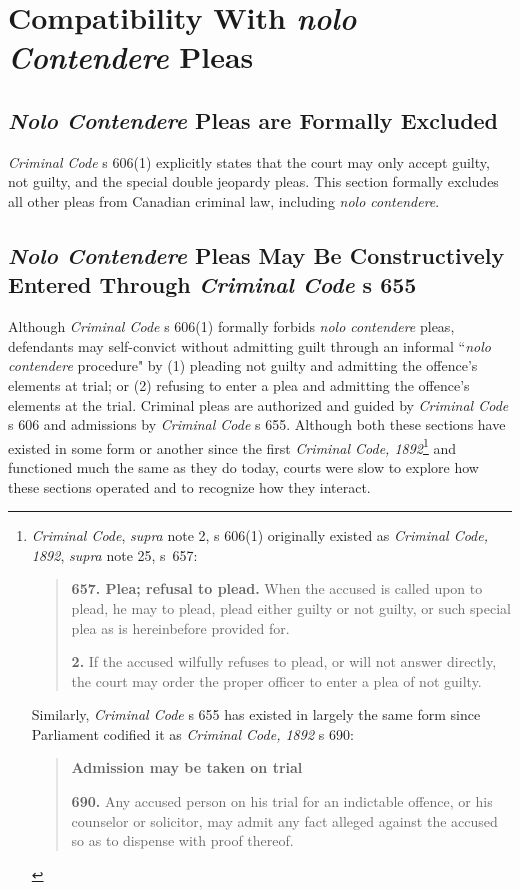 \section{Compatibility With \textit{nolo Contendere} Pleas}

\subsection{\textit{Nolo Contendere} Pleas are Formally Excluded}

\textit{Criminal Code} s 606(1) explicitly states that the court may only accept guilty, not guilty, and the special double jeopardy pleas. This section formally excludes all other pleas from Canadian criminal law, including \textit{nolo contendere}. 

\subsection{\textit{Nolo Contendere} Pleas May Be Constructively Entered Through \textit{Criminal Code} s 655}

Although \textit{Criminal Code} s 606(1) formally forbids \textit{nolo contendere} pleas, defendants may self-convict without admitting guilt through an informal ``\textit{nolo contendere} procedure" by (1) pleading not guilty and admitting the offence's elements at trial; or (2) refusing to enter a plea and admitting the offence's elements at the trial. Criminal pleas are authorized and guided by \textit{Criminal Code} s 606 and admissions by \textit{Criminal Code} s 655. Although both these sections have existed in some form or another since the first \textit{Criminal Code, 1892}\footnote{\textit{Criminal Code}, \textit{supra} note 2, s 606(1) originally existed as \textit{Criminal Code, 1892}, \textit{supra} note 25, s 657:

\begin{quote}
\textbf{657. Plea; refusal to plead.} When the accused is called upon to plead, he may to plead, plead either guilty or not guilty, or such special plea as is hereinbefore provided for.

\textbf{2.} If the accused wilfully refuses to plead, or will not answer directly, the court may order the proper officer to enter a plea of not guilty. 
\end{quote}

Similarly, \textit{Criminal Code} s 655 has existed in largely the same form since Parliament codified it as \textit{Criminal Code, 1892} s 690:
\begin{quote}
    \textbf{Admission may be taken on trial}
    
    \textbf{690.} Any accused person on his trial for an indictable offence, or his counselor or solicitor, may admit any fact alleged against the accused so as to dispense with proof thereof.
\end{quote}
} and functioned much the same as they do today, courts were slow to explore how these sections operated and to recognize how they interact.

